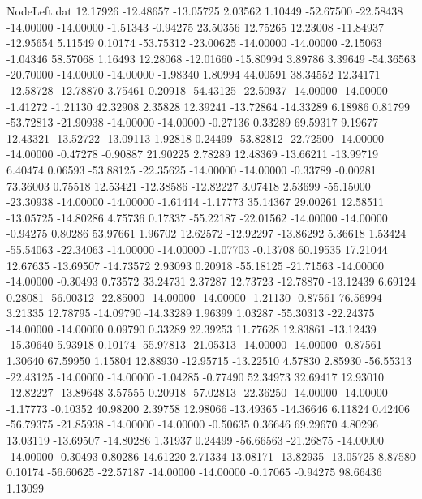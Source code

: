 \begin{filecontents}{NodeLeft.dat}
  12.17926  -12.48657  -13.05725     2.03562    1.10449  -52.67500  -22.58438  -14.00000  -14.00000   -1.51343   -0.94275   23.50356   12.75265
  12.23008  -11.84937  -12.95654     5.11549    0.10174  -53.75312  -23.00625  -14.00000  -14.00000   -2.15063   -1.04346   58.57068    1.16493
  12.28068  -12.01660  -15.80994     3.89786    3.39649  -54.36563  -20.70000  -14.00000  -14.00000   -1.98340    1.80994   44.00591   38.34552
  12.34171  -12.58728  -12.78870     3.75461    0.20918  -54.43125  -22.50937  -14.00000  -14.00000   -1.41272   -1.21130   42.32908    2.35828
  12.39241  -13.72864  -14.33289     6.18986    0.81799  -53.72813  -21.90938  -14.00000  -14.00000   -0.27136    0.33289   69.59317    9.19677
  12.43321  -13.52722  -13.09113     1.92818    0.24499  -53.82812  -22.72500  -14.00000  -14.00000   -0.47278   -0.90887   21.90225    2.78289
  12.48369  -13.66211  -13.99719     6.40474    0.06593  -53.88125  -22.35625  -14.00000  -14.00000   -0.33789   -0.00281   73.36003    0.75518
  12.53421  -12.38586  -12.82227     3.07418    2.53699  -55.15000  -23.30938  -14.00000  -14.00000   -1.61414   -1.17773   35.14367   29.00261
  12.58511  -13.05725  -14.80286     4.75736    0.17337  -55.22187  -22.01562  -14.00000  -14.00000   -0.94275    0.80286   53.97661    1.96702
  12.62572  -12.92297  -13.86292     5.36618    1.53424  -55.54063  -22.34063  -14.00000  -14.00000   -1.07703   -0.13708   60.19535   17.21044
  12.67635  -13.69507  -14.73572     2.93093    0.20918  -55.18125  -21.71563  -14.00000  -14.00000   -0.30493    0.73572   33.24731    2.37287
  12.73723  -12.78870  -13.12439     6.69124    0.28081  -56.00312  -22.85000  -14.00000  -14.00000   -1.21130   -0.87561   76.56994    3.21335
  12.78795  -14.09790  -14.33289     1.96399    1.03287  -55.30313  -22.24375  -14.00000  -14.00000    0.09790    0.33289   22.39253   11.77628
  12.83861  -13.12439  -15.30640     5.93918    0.10174  -55.97813  -21.05313  -14.00000  -14.00000   -0.87561    1.30640   67.59950    1.15804
  12.88930  -12.95715  -13.22510     4.57830    2.85930  -56.55313  -22.43125  -14.00000  -14.00000   -1.04285   -0.77490   52.34973   32.69417
  12.93010  -12.82227  -13.89648     3.57555    0.20918  -57.02813  -22.36250  -14.00000  -14.00000   -1.17773   -0.10352   40.98200    2.39758
  12.98066  -13.49365  -14.36646     6.11824    0.42406  -56.79375  -21.85938  -14.00000  -14.00000   -0.50635    0.36646   69.29670    4.80296
  13.03119  -13.69507  -14.80286     1.31937    0.24499  -56.66563  -21.26875  -14.00000  -14.00000   -0.30493    0.80286   14.61220    2.71334
  13.08171  -13.82935  -13.05725     8.87580    0.10174  -56.60625  -22.57187  -14.00000  -14.00000   -0.17065   -0.94275   98.66436    1.13099

\end{filecontents}
